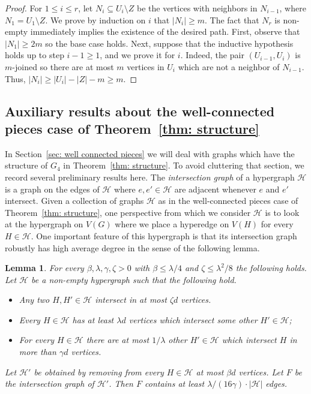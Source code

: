 \documentclass[10pt]{article}
\newtheorem{lemma}[theorem]{Lemma}
\theoremstyle{definition}
\let\leq\leqslant
\let\geq\geqslant
\begin{document}
\begin{proof}
    For $1\leq i\leq r$, let $N_i\subseteq U_i\setminus Z$ be the vertices with neighbors in $N_{i-1}$, where $N_1=U_1\setminus Z$. We prove by induction on $i$ that $|N_i|\geq m$. The fact that $N_r$ is non-empty immediately implies the existence of the desired path. First, observe that $|N_1|\geq 2m$ so the base case holds. Next, suppose that the inductive hypothesis holds up to step $i-1\geq 1$, and we prove it for $i$. Indeed, the pair $(U_{i-1},U_i)$ is $m$-joined so there are at most $m$ vertices in $U_i$ which are not a neighbor of $N_{i-1}$. Thus, $|N_i|\geq |U_i|-|Z|-m\geq m$. 
\end{proof}

    

\subsection{Auxiliary results about the well-connected pieces case of Theorem~\ref{thm: structure}}
In Section~\ref{sec: well connected pieces} we will deal with graphs which have the structure of $G_4$ in Theorem~\ref{thm: structure}. To avoid cluttering that section, we record several preliminary results here. The \textit{intersection graph} of a hypergraph $\mathcal H$ is a graph on the edges of $\mathcal H$ where $e,e'\in\mathcal H$ are adjacent whenever $e$ and $e'$ intersect. Given a collection of graphs $\mathcal H$ as in the well-connected pieces case of Theorem~\ref{thm: structure}, one perspective from which we consider $\mathcal H$ is to look at the hypergraph on $V(G)$ where we place a hyperedge on $V(H)$ for every $H\in\mathcal H$. One important feature of this hypergraph is that its intersection graph robustly has high average degree in the sense of the following lemma.
\begin{lemma}\label{lem: average degree in cluster graph after removal}
    For every $\beta,\lambda,\gamma,\zeta>0$ with $\beta\leq \lambda/4$ and $\zeta\leq \lambda^2/8$ the following holds. Let $\mathcal H$ be a non-empty hypergraph such that the following hold.
    \begin{itemize}
        \item Any two $H,H'\in\mathcal H$ intersect in at most $\zeta d$ vertices.
        \item Every $H\in\mathcal H$ has at least $\lambda  d$ vertices which intersect some other $H'\in\mathcal H$;
        \item For every $H\in\mathcal H$ there are at most $1/\lambda $ other $H'\in\mathcal H$ which intersect $H$ in more than $\gamma d$ vertices.
    \end{itemize}
    Let $\mathcal H'$ be obtained by removing from every $H\in\mathcal H$ at most $\beta d$ vertices. Let $F$ be the intersection graph of $\mathcal H'$. Then $F$ contains at least $\lambda /(16\gamma)\cdot|\mathcal H|$ edges.
\end{lemma}
\end{document}
